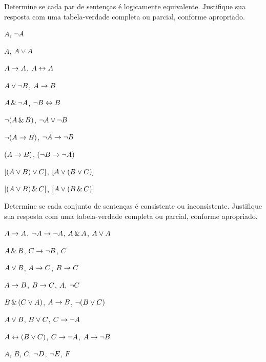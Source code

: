 \solutions
\problempart
\label{pr.TT.equiv}
Determine se cada par de sentenças é logicamente equivalente. Justifique sua resposta com uma tabela-verdade completa ou parcial, conforme apropriado.
\begin{earg}
\item $A$, $\neg A$ %
\item $A$, $A \vee A$ %
\item $A\rightarrow A$, $A \leftrightarrow A$ %
\item $A \vee \neg B$, $A\rightarrow B$ %
\item $A \,\&\, \neg A$, $\neg B \leftrightarrow B$ %
\item $\neg(A \,\&\, B)$, $\neg A \vee \neg B$ %
\item $\neg(A \rightarrow B)$, $\neg A \rightarrow \neg B$ %
\item $(A \rightarrow B)$, $(\neg B \rightarrow \neg A)$ %
\item $[(A \vee B) \vee C]$, $[A \vee (B \vee C)]$ %
\item $[(A \vee B) \,\&\, C]$, $[A \vee (B \,\&\, C)]$ %
\end{earg}

\solutions
\problempart
\label{pr.TT.consistent}
Determine se cada conjunto de sentenças é consistente ou inconsistente. Justifique sua resposta com uma tabela-verdade completa ou parcial, conforme apropriado.
\begin{earg}
\item $A\rightarrow A$, $\neg A \rightarrow \neg A$, $A\,\&\, A$, $A\vee A$ %
\item $A \,\&\, B$, $C\rightarrow \neg B$, $C$ %
\item $A\vee B$, $A\rightarrow C$, $B\rightarrow C$ %
\item $A\rightarrow B$, $B\rightarrow C$, $A$, $\neg C$ %
\item $B\,\&\,(C\vee A)$, $A\rightarrow B$, $\neg(B\vee C)$  %
\item $A \vee B$, $B\vee C$, $C\rightarrow \neg A$ %
\item $A\leftrightarrow(B\vee C)$, $C\rightarrow \neg A$, $A\rightarrow \neg B$ %
\item $A$, $B$, $C$, $\neg D$, $\neg E$, $F$ %
\end{earg}

